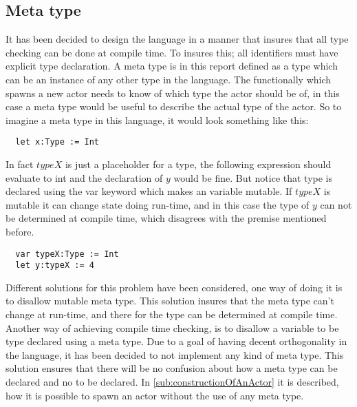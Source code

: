 \subsection{Meta type}
\label{sub:meta_type}

It has been decided to design the language in a manner that insures that all type checking can be done at compile time. To insures this; all identifiers must have explicit type declaration.
A meta type is in this report defined as a type which can be an instance of any other type in the language. %
The functionally which spawns a new actor needs to know of which type the actor should be of, in this case a meta type would be useful to describe the actual type of the actor.
So to imagine a meta type in this language, it would look something like this: %

\begin{verbatim}
  let x:Type := Int
\end{verbatim}

In fact $typeX$ is just a placeholder for a type, the following expression should evaluate to int and the declaration of $y$ would be fine. %
But notice that type is declared using the var keyword which makes an variable mutable. %
If $typeX$ is mutable it can change state doing run-time, and in this case the type of $y$ can not be determined at compile time, which disagrees with the premise mentioned before. %

\begin{verbatim}
  var typeX:Type := Int
  let y:typeX := 4
\end{verbatim}

Different solutions for this problem have been considered, one way of doing it is to disallow mutable meta type. This solution insures that the meta type can't change at run-time, and there for the type can be determined at compile time. Another way of achieving compile time checking, is to disallow a variable to be type declared using a meta type. Due to a goal of having decent orthogonality in the language, it has been decided to not implement any kind of meta type. This solution ensures that there will be no confusion about how a meta type can be declared and no to be declared.
In \cref{sub:constructionOfAnActor} it is described, how it is possible to spawn an actor without the use of any meta type.
